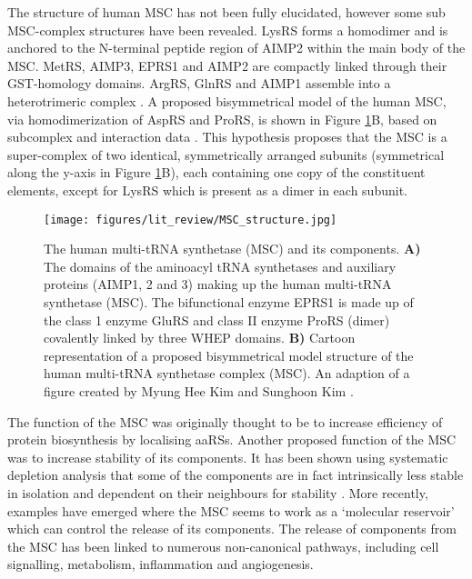 The structure of human MSC has not been fully elucidated, however some sub MSC-complex structures have been revealed.
LysRS forms a homodimer and is anchored to the N-terminal peptide region of AIMP2 within the main body of the MSC.
MetRS, AIMP3, EPRS1 and AIMP2 are compactly linked through their GST-homology domains.
ArgRS, GlnRS and AIMP1 assemble into a heterotrimeric complex \cite{kim2019evolution, khan20203, kim2020structures}.
A proposed bisymmetrical model of the human MSC, via homodimerization of AspRS and ProRS, is shown in Figure \ref{fig:MSC}B, based on subcomplex and interaction data \cite{cho2015assembly, kaminska2009dissection, mirande2017aminoacyl}.
This hypothesis proposes that the MSC is a super-complex of two identical, symmetrically arranged subunits (symmetrical along the y-axis in Figure \ref{fig:MSC}B), each containing one copy of the constituent elements, except for LysRS which is present as a dimer in each subunit.

\begin{figure}[htb]
\centering
\texttt{[image: figures/lit\_review/MSC\_structure.jpg]}
\caption[Multi-tRNA synthetase structure]{The human multi-tRNA synthetase (MSC) and its components.
\textbf{A)} The domains of the aminoacyl tRNA synthetases and auxiliary proteins (AIMP1, 2 and 3) making up the human multi-tRNA synthetase (MSC).
The bifunctional enzyme EPRS1 is made up of the class 1 enzyme GluRS and class II enzyme ProRS (dimer) covalently linked by three WHEP domains.
\textbf{B)} Cartoon representation of a proposed bisymmetrical model structure of the human multi-tRNA synthetase complex (MSC).
An adaption of a figure created by Myung Hee Kim and Sunghoon Kim \cite{kim2020structures}.
}
\label{fig:MSC}\end{figure}

The function of the MSC was originally thought to be to increase efficiency of protein biosynthesis by localising aaRSs.
Another proposed function of the MSC was to increase stability of its components.
It has been shown using systematic depletion analysis that some of the components are in fact intrinsically less stable in isolation and dependent on their neighbours for stability \cite{han2006hierarchical}.
More recently, examples have emerged where the MSC seems to work as a `molecular reservoir' which can control the release of its components.
The release of components from the MSC has been linked to numerous non-canonical pathways, including cell signalling, metabolism, inflammation and angiogenesis.

